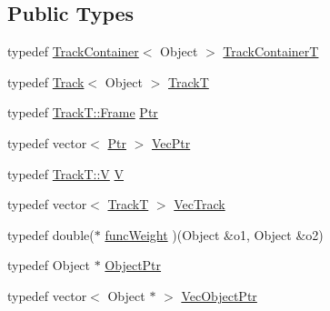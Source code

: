 \subsection*{\-Public \-Types}
\begin{DoxyCompactItemize}
\item 
typedef \hyperlink{class_track_container}{\-Track\-Container}$<$ \-Object $>$ \hyperlink{class_i_m_f_t_a8aad0b1bd309bfb92abb74ce45e549a9}{\-Track\-Container\-T}
\item 
typedef \hyperlink{class_track}{\-Track}$<$ \-Object $>$ \hyperlink{class_i_m_f_t_a37f74f73fc6d19920930474c5522e242}{\-Track\-T}
\item 
typedef \hyperlink{struct_track_1_1_frame}{\-Track\-T\-::\-Frame} \hyperlink{class_i_m_f_t_ab9da2d474c63076c3a194d343fc20169}{\-Ptr}
\item 
typedef vector$<$ \hyperlink{class_i_m_f_t_ab9da2d474c63076c3a194d343fc20169}{\-Ptr} $>$ \hyperlink{class_i_m_f_t_a47e5af5b3e023928bd7ddc6ddbf6044c}{\-Vec\-Ptr}
\item 
typedef \hyperlink{struct_track_1_1_v}{\-Track\-T\-::\-V} \hyperlink{class_i_m_f_t_ad22184fa80718f8e5087d8cec78a6323}{\-V}
\item 
typedef vector$<$ \hyperlink{class_i_m_f_t_a37f74f73fc6d19920930474c5522e242}{\-Track\-T} $>$ \hyperlink{class_i_m_f_t_a55e4fd327687c579749d3ca13e0f621e}{\-Vec\-Track}
\item 
typedef double($\ast$ \hyperlink{class_i_m_f_t_ae7436174afe28b7a25237c97b2b9f416}{func\-Weight} )(\-Object \&o1, \-Object \&o2)
\item 
typedef \-Object $\ast$ \hyperlink{class_i_m_f_t_a9f291b28e2caab20361d790d02774dfe}{\-Object\-Ptr}
\item 
typedef vector$<$ \-Object $\ast$ $>$ \hyperlink{class_i_m_f_t_a03dc658b57ff8debb2b6869be37c0d67}{\-Vec\-Object\-Ptr}
\end{DoxyCompactItemize}

